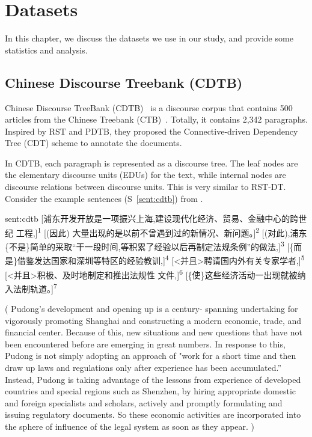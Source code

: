 %
%
%
\chapter{Datasets}
\label{c:datasets}

In this chapter, we discuss the datasets we use in our study, and
provide some statistics and analysis.

\section{Chinese Discourse Treebank (CDTB)}

Chinese Discourse TreeBank (CDTB)~\citep{li2014building} is a discourse
corpus that contains 500 articles from the Chinese Treebank (CTB)~\citep{xue2005penn}.
Totally, it contains 2,342 paragraphs.
Inspired by RST and PDTB, they proposed the Connective-driven Dependency Tree (CDT)
scheme to annotate the documents.

In CDTB, each paragraph is represented as a discourse tree. The leaf nodes are the
elementary discourse units (EDUs) for the text, while internal nodes are discourse
relations between discourse units. This is very similar to RST-DT.
Consider the example sentences (S~\ref{sent:cdtb}) from \cite{li2014building}.

\begin{sent}{sent:cdtb}{}
[浦东开发开放是一项振兴上海,建设现代化经济、贸易、金融中心的跨世纪
工程,]\textsuperscript{1}
[(因此) 大量出现的是以前不曾遇到过的新情况、新问题。]\textsuperscript{2}
[(对此),浦东\{不是\}简单的采取“干一段时间,等积累了经验以后再制定法规条例”的做法,]\textsuperscript{3}
[\{而是\}借鉴发达国家和深圳等特区的经验教训,]\textsuperscript{4}
[<并且>聘请国内外有关专家学者,]\textsuperscript{5}
[<并且>积极、及时地制定和推出法规性 文件,]\textsuperscript{6}
[\{使\}这些经济活动一出现就被纳入法制轨道。]\textsuperscript{7}

(
Pudong's development and opening up is a century-
spanning undertaking for vigorously promoting Shanghai and
constructing a modern economic, trade, and financial center.
Because of this, new situations and new questions that have
not been encountered before are emerging in great numbers.
In response to this, Pudong is not simply adopting an approach
of "work for a short time and then draw up laws and regulations
only after experience has been accumulated.”
Instead, Pudong is taking advantage of the lessons from experience of
developed countries and special regions such as Shenzhen,
by hiring appropriate domestic and foreign specialists and
scholars,
actively and promptly formulating and issuing
regulatory documents.
So these economic activities are incorporated into the sphere
of influence of the legal system as soon as they appear.
)
\end{sent}

